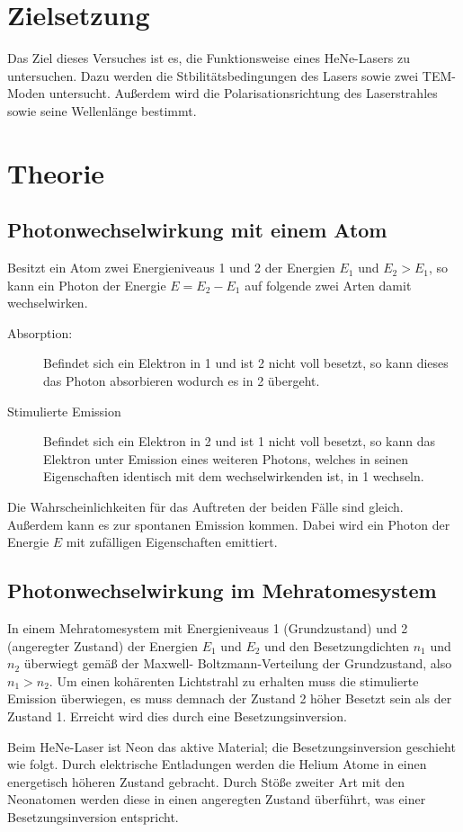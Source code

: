 \section{Zielsetzung}
Das Ziel dieses Versuches ist es, die Funktionsweise eines HeNe-Lasers zu
untersuchen. Dazu werden die Stbilitätsbedingungen des Lasers sowie zwei TEM-
Moden untersucht. Außerdem wird die Polarisationsrichtung des Laserstrahles
sowie seine Wellenlänge bestimmt.\cite{AP}


\section{Theorie}
\subsection{Photonwechselwirkung mit einem Atom}
Besitzt ein Atom zwei Energieniveaus 1 und 2 der Energien $E_1$ und $E_2>E_1$, so kann ein Photon der Energie $E=E_2-E_1$ auf folgende zwei Arten damit
wechselwirken.
\begin{description}
\item[Absorption:] Befindet sich ein Elektron in 1 und ist 2 nicht voll
besetzt, so kann dieses das Photon absorbieren wodurch es in 2 übergeht.
\item[Stimulierte Emission] Befindet sich ein Elektron in 2 und ist 1 nicht voll besetzt, so kann das Elektron unter Emission eines weiteren Photons, welches in seinen Eigenschaften identisch mit dem wechselwirkenden ist, in 1 wechseln.
\end{description}
Die Wahrscheinlichkeiten für das Auftreten der beiden Fälle sind gleich.
Außerdem kann es zur spontanen Emission kommen. Dabei wird ein Photon der Energie $E$ mit zufälligen Eigenschaften emittiert.
\subsection{Photonwechselwirkung im Mehratomesystem}
In einem Mehratomesystem mit Energieniveaus 1 (Grundzustand) und 2 (angeregter
Zustand) der Energien $E_1$ und
$E_2$ und den Besetzungdichten $n_1$ und $n_2$ überwiegt gemäß der Maxwell-
Boltzmann-Verteilung der Grundzustand, also $n_1>n_2$. Um einen kohärenten
Lichtstrahl zu erhalten muss die stimulierte Emission überwiegen, es muss
demnach der Zustand 2 höher Besetzt sein als der Zustand 1. Erreicht wird
dies durch eine Besetzungsinversion.

Beim HeNe-Laser ist Neon das aktive Material; die Besetzungsinversion
geschieht wie folgt. Durch elektrische Entladungen werden die Helium Atome in
einen energetisch höheren Zustand gebracht. Durch Stöße zweiter Art mit den
Neonatomen werden diese in einen angeregten Zustand überführt, was einer
Besetzungsinversion entspricht.

